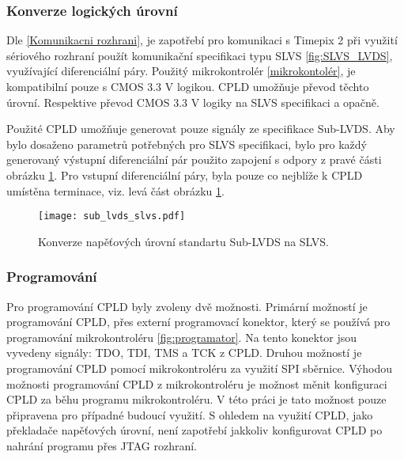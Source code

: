 	\subsubsection{Konverze logických úrovní}
	\label{CPLD konverze}
	Dle \ref{Komunikacni rozhrani}, je zapotřebí pro komunikaci s Timepix 2 při využití sériového rozhraní použít komunikační specifikaci typu SLVS \ref{fig:SLVS_LVDS}, využívající diferenciální páry. Použitý mikrokontrolér \ref{mikrokontolér}, je kompatibilní pouze s CMOS 3.3 V logikou. CPLD umožňuje převod těchto úrovní. Respektive převod CMOS 3.3 V logiky na SLVS specifikaci a opačně.
	\par Použité CPLD umožňuje generovat pouze signály ze specifikace Sub-LVDS. Aby bylo dosaženo parametrů potřebných pro SLVS specifikaci, bylo pro každý generovaný výstupní diferenciální pár použito zapojení s odpory z pravé části obrázku \ref{fig:sub_lvds_slvs}. Pro vstupní diferenciální páry, byla pouze co nejblíže k CPLD umístěna terminace, viz. levá část obrázku \ref{fig:sub_lvds_slvs}.
\begin{comment} 
	Programová implementace generování diferenciálních signálů pro MachXO2 obsahující pouze část architektury pro konverzi logických úrovní je zobrazena v ukázkovém kódu \ref{kod_vhdl}.
\begin{lstlisting}[frame=single, language=VHDL, caption={Ukázkový kód ve VHDL pro CPLD}, label=kod_vhdl]
	architecture behavioral of t2m is
	begin
	-- CMOS -> SLVS
	DATA_IN_SLVS	<= DATA_IN;
	nCS_IN_SLVS	<= nCS_IN;
	DCLOCK_IN_SLVS	<= DCLOCK_IN;
	MCLOCK_SLVS	<= MCLOCK;
	-- SLVS -> CMOS
	DATA_OUT	<= DATA_OUT_SLVS;
	DCLOCK_OUT	<= DCLOCK_OUT_SLVS;
	nCS_OUT		<= nCS_OUT_SLVS;
	end architecture behavioral ;
\end{lstlisting}
\end{comment}
	
	\begin{figure}[h!]
	\centering
	\captionsetup{justification=centering}
	\texttt{[image: sub\_lvds\_slvs.pdf]}
	\caption{Konverze napěťových úrovní standartu Sub-LVDS na SLVS.} 
	\label{fig:sub_lvds_slvs}
	\end{figure}
	\subsubsection{Programování}
	Pro programování CPLD byly zvoleny dvě možnosti. Primární možností je programování CPLD, přes externí programovací konektor, který se používá pro programování mikrokontroléru \ref{fig:programator}. Na tento konektor jsou vyvedeny signály: TDO, TDI, TMS a TCK z CPLD. Druhou možností je programování CPLD pomocí mikrokontroléru za využití SPI sběrnice. Výhodou možnosti programování CPLD z mikrokontroléru je možnost měnit konfiguraci CPLD za běhu programu mikrokontroléru. V této práci je tato možnost pouze připravena pro případné budoucí využití. S ohledem na využití CPLD, jako překladače napěťových úrovní, není zapotřebí jakkoliv konfigurovat CPLD po nahrání programu přes JTAG rozhraní.
